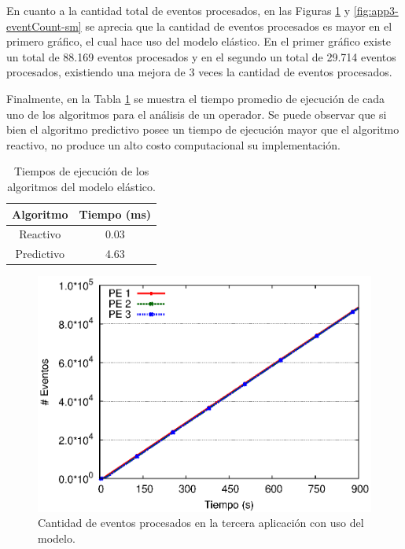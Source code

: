 En cuanto a la cantidad total de eventos procesados, en las Figuras \ref{fig:app3-eventCount-cm} y \ref{fig:app3-eventCount-sm} se aprecia que la cantidad de eventos procesados es mayor en el primero gráfico, el cual hace uso del modelo elástico. En el primer gráfico existe un total de 88.169 eventos procesados y en el segundo un total de 29.714 eventos procesados, existiendo una mejora de 3 veces la cantidad de eventos procesados.


Finalmente, en la Tabla \ref{tab:tiempo-algoritmos} se muestra el tiempo promedio de ejecución de cada uno de los algoritmos para el análisis de un operador. Se puede observar que si bien el algoritmo predictivo posee un tiempo de ejecución mayor que el algoritmo reactivo, no produce un alto costo computacional su implementación.

\begin{table}[!ht]
\centering
\caption{Tiempos de ejecución de los algoritmos del modelo elástico.}
\begin{tabular}{| c | c |}
\hline
Algoritmo & Tiempo (ms) \\ \hline
Reactivo & 0.03 \\
Predictivo & 4.63 \\ \hline
\end{tabular}
\label{tab:tiempo-algoritmos}
\end{table}

\newpage

\begin{figure}[!ht]
\centering
    \includegraphics[scale=0.75]{images/exp/app3/cm/logical/eventCount.eps}
    \caption{Cantidad de eventos procesados en la tercera aplicación con uso del modelo.}
    \label{fig:app3-eventCount-cm}
\end{figure}

